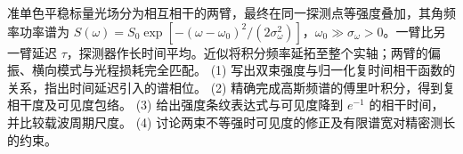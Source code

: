 准单色平稳标量光场分为相互相干的两臂，最终在同一探测点等强度叠加，其角频率功率谱为 \(S(\omega)=S_0\exp[-(\omega-\omega_0)^2/(2\sigma_\omega^2)]\)，\(\omega_0\gg\sigma_\omega>0\)。一臂比另一臂延迟 \(\tau\)，探测器作长时间平均。近似将积分频率延拓至整个实轴；两臂的偏振、横向模式与光程损耗完全匹配。
(1) 写出双束强度与归一化复时间相干函数的关系，指出时间延迟引入的谱相位。
(2) 精确完成高斯频谱的傅里叶积分，得到复相干度及可见度包络。
(3) 给出强度条纹表达式与可见度降到 \(e^{-1}\) 的相干时间，并比较载波周期尺度。
(4) 讨论两束不等强时可见度的修正及有限谱宽对精密测长的约束。
